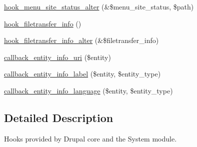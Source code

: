 \begin{DoxyCompactItemize}
\hyperlink{group__hooks_ga3096be11aad61c8b342ade94789f6137}{hook\_\-menu\_\-site\_\-status\_\-alter} (\&\$menu\_\-site\_\-status, \$path)
\item 
\hyperlink{group__hooks_gacecdedb61704444382417e6ec8da240d}{hook\_\-filetransfer\_\-info} ()
\item 
\hyperlink{group__hooks_ga96aeda9756a48de73dacbf8bf1745266}{hook\_\-filetransfer\_\-info\_\-alter} (\&\$filetransfer\_\-info)
\item 
\hyperlink{group__callbacks_ga42bf4e69ee32b2bc99d0d774d4917254}{callback\_\-entity\_\-info\_\-uri} (\$entity)
\item 
\hyperlink{group__callbacks_gae9464157712e8322955f45a671a8403d}{callback\_\-entity\_\-info\_\-label} (\$entity, \$entity\_\-type)
\item 
\hyperlink{group__callbacks_ga6e4c07daa3660701139f60cd79bb3665}{callback\_\-entity\_\-info\_\-language} (\$entity, \$entity\_\-type)
\end{DoxyCompactItemize}


\subsection{Detailed Description}
Hooks provided by Drupal core and the System module. 